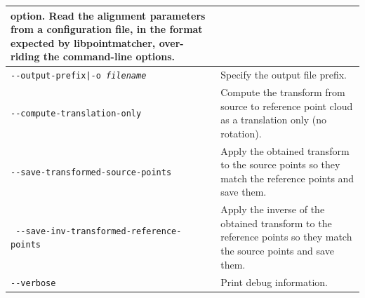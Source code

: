 \begin{longtable}{|l|p{10cm}|}
option. Read the alignment parameters from a configuration file, in the
format expected by libpointmatcher, over-riding the command-line options.\\ \hline
\texttt{-\/-output-prefix|-o \textit{filename}} & Specify the output file prefix. \\ \hline
\texttt{-\/-compute-translation-only} & Compute the transform from source to reference point cloud as a translation only (no rotation). \\ \hline
\texttt{-\/-save-transformed-source-points} & Apply the obtained transform to the source points so they match the reference points and save them. \\ \hline
\texttt{ -\/-save-inv-transformed-reference-points} & Apply the inverse of the obtained transform to the reference points so they match the source points and save them.
\\ \hline
\texttt{-\/-verbose} & Print debug information. \\ \hline
\end{longtable}
